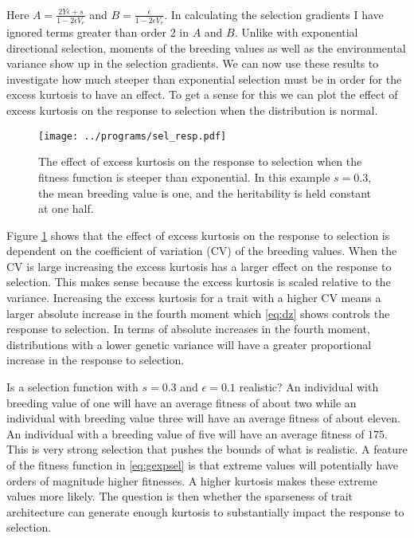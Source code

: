 Here $A = \frac{2\bar{Y}\epsilon + s}{1 - 2\epsilon V_e}$ and $B =
\frac{\epsilon}{1 - 2\epsilon V_e}.$ In calculating the selection gradients I
have ignored terms greater than order 2 in $A$ and $B$. Unlike with exponential
directional selection, moments of the breeding values as well as the
environmental variance show up in the selection gradients. We can now use these
results to investigate how much steeper than exponential selection must be in
order for the excess kurtosis to have an effect. To get a sense for this we can
plot the effect of excess kurtosis on the response to selection when the
distribution is normal.

\begin{figure}[H]
  \texttt{[image: ../programs/sel\_resp.pdf]}
  \caption{The effect of excess kurtosis on the response to selection when the
    fitness function is steeper than exponential. In this example $s=0.3$, the
    mean breeding value is one, and the heritability is held constant at one half.}
  \label{fig:selresp}
\end{figure}

Figure \ref{fig:selresp} shows that the effect of excess kurtosis on the response
to selection is dependent on the coefficient of variation (CV) of the breeding
values. When the CV is large increasing the excess kurtosis has a larger effect
on the response to selection. This makes sense because the excess kurtosis is
scaled relative to the variance. Increasing the excess kurtosis for a trait with
a higher CV means a larger absolute increase in the fourth moment which
\eqref{eq:dz} shows controls the response to selection. In terms of absolute
increases in the fourth moment, distributions with a lower genetic variance will
have a greater proportional increase in the response to selection. 

Is a selection function with $s=0.3$ and $\epsilon=0.1$ realistic? An individual
with breeding value of one will have an average fitness of about two while an
individual with breeding value three will have an average fitness of about
eleven. An individual with a breeding value of five will have an average fitness
of $175$. This is very strong selection that pushes the bounds of what is
realistic. A feature of the fitness function in \eqref{eq:gexpsel} is that
extreme values will potentially have orders of magnitude higher fitnesses. A
higher kurtosis makes these extreme values more likely. The question is then
whether the sparseness of trait architecture can generate enough kurtosis to
substantially impact the response to selection.


